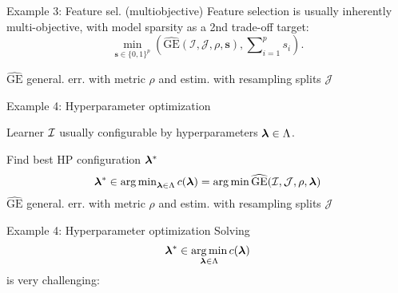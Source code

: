 \documentclass[11pt,compress,t,notes=noshow, xcolor=table]{beamer}
\begin{document}
\begin{frame2}{Example 3: Feature sel. (multiobjective)}
Feature selection is usually inherently multi-objective,
with model sparsity as a 2nd trade-off target:
$$
\min_{\textbf{s} \in \{0, 1\}^p} \left(\widehat{\text{GE}}(\mathcal{I}, \mathcal{J}, \rho, \bm{s}), \sum\nolimits_{i = 1}^p s_i\right).
$$

$\widehat{\text{GE}}$ general. err. with metric $\rho$ and estim. with resampling splits $\mathcal{J}$
\spacer
{}
\end{frame2}


\begin{framei}{Example 4: Hyperparameter optimization}
\item Learner $\mathcal{I}$ usually configurable by hyperparameters $\bm{\lambda} \in \Lambda$.
\item Find best HP configuration $\bm{\lambda}^\ast$
$$
\bm{\lambda}^\ast \in \mathop{\mathrm{arg\,min}}\nolimits_{\bm{\lambda} \in \Lambda} c(\bm{\lambda}) = \mathop{\mathrm{arg\,min}} \widehat{\text{GE}}(\mathcal{I}, \mathcal{J}, \rho, \bm{\lambda})
$$
$\widehat{\text{GE}}$ general. err. with metric $\rho$ and estim. with resampling splits $\mathcal{J}$
\spacer
{}
\end{framei}


\begin{frame2}{Example 4: Hyperparameter optimization}
Solving
$$
\bm{\lambda}^\ast \in \mathop{\mathrm{arg\,min}}_{\bm{\lambda} \in \Lambda} c(\bm{\lambda})
$$
is very challenging:
\end{frame2}
\end{document}
